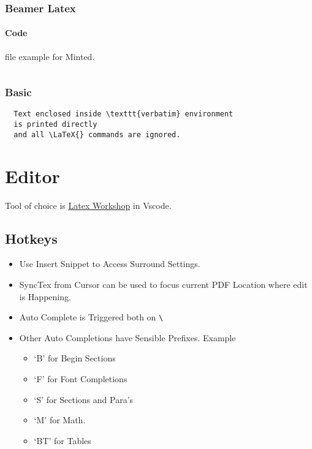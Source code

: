 \documentclass{report}[a4paper,12pt] %
\begin{document}
\subsubsection{Beamer Latex}
\label{code:file}
\paragraph{Code} file example for Minted.
\inputminted{tex}{../../presentation/beamer/tutorial.tex} 

\subsubsection{Basic}
\begin{verbatim}
  Text enclosed inside \texttt{verbatim} environment 
  is printed directly 
  and all \LaTeX{} commands are ignored.
\end{verbatim}

\section{Editor}
Tool of choice is \href{https://github.com/James-Yu/LaTeX-Workshop}{Latex Workshop} in Vscode.
\subsection{Hotkeys}
\begin{itemize}
  \item Use Insert Snippet to Access Surround Settings.
  \item SyncTex from Cursor can be used to focus current PDF Location where edit is Happening.
  \item Auto Complete is Triggered both on \verb|\|
  \item Other Auto Completions have Sensible Prefixes. Example
  \begin{itemize}
    \item `B' for Begin Sections
    \item `F' for Font Completions
    \item `S' for Sections and Para's
    \item `M' for Math.
    \item `BT' for Tables
  \end{itemize}
\end{itemize}
\end{document}
